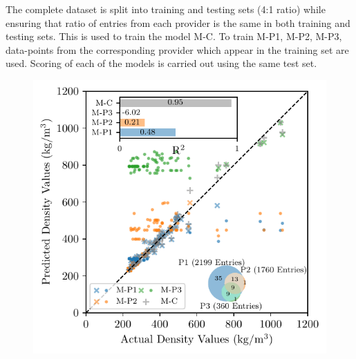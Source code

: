 \documentclass{article}
\begin{document}
	The complete dataset is split into training and testing sets (4:1 ratio) while ensuring that ratio of entries from each provider is the same in both training and testing sets. This is used to train the model M-C. To train M-P1, M-P2, M-P3, data-points from the corresponding provider which appear in the training set are used. Scoring of each of the models is carried out using the same test set.
%	
%	
%	
	
	

	\begin{figure}[h]
		\centering
		\includegraphics[]{scatterPlot.pdf}
		\caption{} 
		\label{fig: exampleFig}
	\end{figure}
\end{document}
